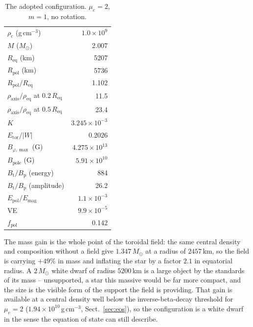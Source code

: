\documentclass{aa}
\begin{document}
\begin{table}
\caption{The adopted configuration. $\mu_e = 2$, $m = 1$, no rotation.}
\label{tab:config}
\centering
\begin{tabular}{l r}
\hline\hline
$\rho_c$ (g\,cm$^{-3}$)                        & $1.0\times10^{9}$ \\
$M$ ($M_\odot$)                                & 2.007 \\
$R_{\mathrm{eq}}$ (km)                         & 5207 \\
$R_{\mathrm{pol}}$ (km)                        & 5736 \\
$R_{\mathrm{pol}}/R_{\mathrm{eq}}$             & 1.102 \\
$\rho_{\mathrm{axis}}/\rho_{\mathrm{eq}}$ at $0.2\,R_{\mathrm{eq}}$ & 11.5 \\
$\rho_{\mathrm{axis}}/\rho_{\mathrm{eq}}$ at $0.5\,R_{\mathrm{eq}}$ & 23.4 \\
$K$                                            & $3.245\times10^{-3}$ \\
$E_{\mathrm{tor}}/|W|$                         & 0.2026 \\
$B_{\varphi,\max}$ (G)                         & $4.275\times10^{13}$ \\
$B_{\mathrm{pole}}$ (G)                        & $5.91\times10^{10}$ \\
$B_{\mathrm{t}}/B_{\mathrm{p}}$ (energy)       & 884 \\
$B_{\mathrm{t}}/B_{\mathrm{p}}$ (amplitude)    & 26.2 \\
$E_{\mathrm{pol}}/E_{\mathrm{mag}}$            & $1.1\times10^{-3}$ \\
VE                                             & $9.9\times10^{-5}$ \\
$f_{\mathrm{pol}}$                             & 0.142 \\
\hline
\end{tabular}
\end{table}

The mass gain is the whole point of the toroidal field: the same central
density and composition without a field give $1.347\,M_\odot$ at a radius
of $2457$\,km, so the field is carrying $+49\%$ in mass and inflating the
star by a factor $2.1$ in equatorial radius. A $2\,M_\odot$ white dwarf
of radius $5200$\,km is a large object by the standards of its mass --
unsupported, a star this massive would be far more compact, and the size
is the visible form of the support the field is providing. That gain is available at a central density
well below the inverse-beta-decay threshold for $\mu_e = 2$
($1.94\times10^{10}$\,g\,cm$^{-3}$, Sect.~\ref{sec:eos}), so the
configuration is a white dwarf in the sense the equation of state can
still describe.
\end{document}
